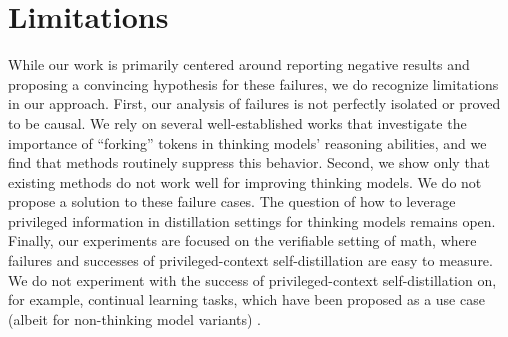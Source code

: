 \section{Limitations}
\label{ap:limitations}

While our work is primarily centered around reporting negative results and proposing a convincing hypothesis for these failures, we do recognize limitations in our approach. First, our analysis of failures is not perfectly isolated or proved to be causal. We rely on several well-established works that investigate the importance of ``forking'' tokens in thinking models' reasoning abilities, and we find that \opsd{} methods routinely suppress this behavior. Second, we show only that existing \opsd{} methods do not work well for improving thinking models. We do not propose a solution to these failure cases. The question of how to leverage privileged information in distillation settings for thinking models remains open. Finally, our experiments are focused on the verifiable setting of math, where failures and successes of privileged-context self-distillation are easy to measure. We do not experiment with the success of privileged-context self-distillation on, for example, continual learning tasks, which have been proposed as a use case (albeit for non-thinking model variants) \cite{shenfeld2026self}.
